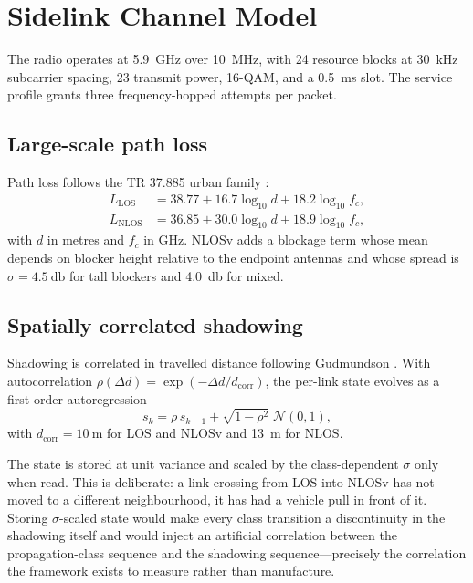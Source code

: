 \documentclass[conference]{IEEEtran}
\begin{document}
\section{Sidelink Channel Model}
\label{sec:rf}

The radio operates at \SI{5.9}{\giga\hertz} over \SI{10}{\mega\hertz}, with
\num{24} resource blocks at \SI{30}{\kilo\hertz} subcarrier spacing,
\SI{23}{\dBm} transmit power, 16-QAM, and a \SI{0.5}{\milli\second} slot. The
service profile grants three frequency-hopped attempts per packet.

\subsection{Large-scale path loss}

Path loss follows the TR 37.885 urban family \cite{tr37885}:
\begin{align}
L_{\mathrm{LOS}} &= 38.77 + 16.7\log_{10}d + 18.2\log_{10}f_c,\\
L_{\mathrm{NLOS}} &= 36.85 + 30.0\log_{10}d + 18.9\log_{10}f_c,
\end{align}
with $d$ in metres and $f_c$ in \si{\giga\hertz}. NLOSv adds a blockage term
whose mean depends on blocker height relative to the endpoint antennas and
whose spread is $\sigma=\SI{4.5}{\decibel}$ for tall blockers and
\SI{4.0}{\decibel} for mixed.

\subsection{Spatially correlated shadowing}

Shadowing is correlated in travelled distance following Gudmundson
\cite{gudmundson1991}. With autocorrelation $\rho(\Delta d)=
\exp(-\Delta d/d_{\mathrm{corr}})$, the per-link state evolves as a
first-order autoregression
\begin{equation}
s_{k} = \rho\,s_{k-1} + \sqrt{1-\rho^{2}}\;\mathcal{N}(0,1),
\end{equation}
with $d_{\mathrm{corr}}=\SI{10}{\meter}$ for LOS and NLOSv and
\SI{13}{\meter} for NLOS.

The state is stored at unit variance and scaled by the class-dependent
$\sigma$ only when read. This is deliberate: a link crossing from LOS into
NLOSv has not moved to a different neighbourhood, it has had a vehicle pull in
front of it. Storing $\sigma$-scaled state would make every class transition a
discontinuity in the shadowing itself and would inject an artificial
correlation between the propagation-class sequence and the shadowing
sequence---precisely the correlation the framework exists to measure rather
than manufacture.
\end{document}
